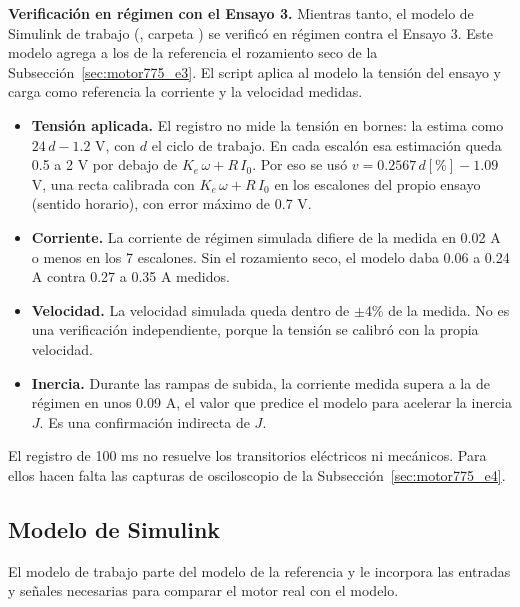 \textbf{Verificación en régimen con el Ensayo 3.} Mientras tanto, el modelo de Simulink de trabajo (, carpeta ) se verificó en régimen contra el Ensayo 3. Este modelo agrega a los de la referencia el rozamiento seco de la Subsección~\ref{sec:motor775_e3}. El script  aplica al modelo la tensión del ensayo y carga como referencia la corriente y la velocidad medidas.
\begin{itemize}
\item \textbf{Tensión aplicada.} El registro no mide la tensión en bornes: la estima como $24\,d - 1.2$ V, con $d$ el ciclo de trabajo. En cada escalón esa estimación queda 0.5 a 2 V por debajo de $K_e\,\omega + R\,I_0$. Por eso se usó $v = 0.2567\,d[\%] - 1.09$ V, una recta calibrada con $K_e\,\omega + R\,I_0$ en los escalones del propio ensayo (sentido horario), con error máximo de 0.7 V.
\item \textbf{Corriente.} La corriente de régimen simulada difiere de la medida en 0.02 A o menos en los 7 escalones. Sin el rozamiento seco, el modelo daba 0.06 a 0.24 A contra 0.27 a 0.35 A medidos.
\item \textbf{Velocidad.} La velocidad simulada queda dentro de $\pm$4\% de la medida. No es una verificación independiente, porque la tensión se calibró con la propia velocidad.
\item \textbf{Inercia.} Durante las rampas de subida, la corriente medida supera a la de régimen en unos 0.09 A, el valor que predice el modelo para acelerar la inercia $J$. Es una confirmación indirecta de $J$.
\end{itemize}
El registro de 100 ms no resuelve los transitorios eléctricos ni mecánicos. Para ellos hacen falta las capturas de osciloscopio de la Subsección~\ref{sec:motor775_e4}.

\subsection{Modelo de Simulink}
\label{sec:motor775_simulink}
El modelo de trabajo  parte del modelo de la referencia y le incorpora las entradas y señales necesarias para comparar el motor real con el modelo.

